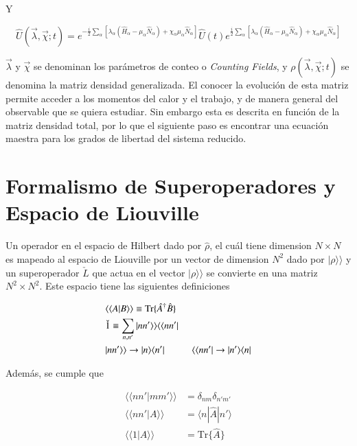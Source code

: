 Y 

\begin{equation*}
    \hat{U}(\vec{\lambda},\vec{\chi};t) = e^{-\frac{i}{2}\sum_{\alpha}[\lambda_{\alpha}(\hat{H}_{\alpha} - \mu_{\alpha}\hat{N}_{\alpha} ) + \chi_{\alpha}\mu_{\alpha}\hat{N}_{\alpha} ]  } \hat{U}(t) e^{\frac{i}{2}\sum_{\alpha}[ \lambda_{\alpha}(\hat{H}_{\alpha} - \mu_{\alpha}\hat{N}_{\alpha}) + \chi_{\alpha}\mu_{\alpha}\hat{N}_{\alpha} ]}
\end{equation*}

$\vec{\lambda}$ y $\vec{\chi}$ se denominan los parámetros de conteo o \textit{Counting Fields}, y $\rho(\vec{\lambda},\vec{\chi};t)$ se denomina la matriz densidad generalizada. El conocer la evolución de esta matriz permite acceder a los momentos del calor y el trabajo, y de manera general del observable que se quiera estudiar. Sin embargo esta es descrita en función de la matriz densidad total, por lo que el siguiente paso es encontrar una ecuación maestra para los grados de libertad del sistema reducido.

\label{sec2:estadistica2puntos}


\section{Formalismo de Superoperadores y Espacio de Liouville}
Un operador en el espacio de Hilbert dado por $\hat{\rho}$, el cuál tiene dimension $N\times N$ es mapeado al espacio de Liouville por un vector de dimension $N^{2}$ dado por $|\rho \rangle \rangle$  y un superoperador $\check{L}$ que actua en el vector $|\rho\rangle \rangle$ se convierte en una matriz $N^{2}\times N^{2}$. Este espacio tiene las siguientes definiciones

\begin{align*}
    &\langle \langle A|B\rangle \rangle  \equiv \text{Tr}\{\hat{A}^{\dagger}\hat{B}\} \\
   &\check{1}  \equiv \sum_{n,n'}|nn'\rangle \rangle \langle \langle nn'| \\
    & |nn'\rangle \rangle  \to |n\rangle \langle n'|  \hspace{10mm}  \langle \langle nn'| \to |n'\rangle \langle n|     
\end{align*}

Además, se cumple que 

\begin{align*}
    \langle \langle nn'|mm'\rangle \rangle & = \delta_{nm}\delta_{n'm'}\\
    \langle \langle nn'|A\rangle \rangle & = \langle n|\hat{A}|n'\rangle \\
    \langle \langle 1|A\rangle \rangle & = \text{Tr}\{\hat{A}\} 
\end{align*}


